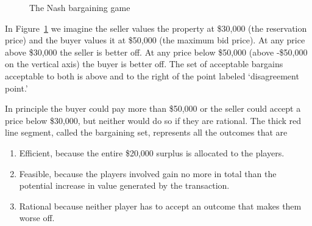 {    \begin{figure}
        \centering
        
        \caption{The Nash bargaining game}
        \label{fig:Nash-bargaining-game}
    \end{figure}


In Figure~\ref{fig:Nash-bargaining-game} we imagine the seller values the property at \$30,000 (the reservation price) and the buyer values it at \$50,000 (the maximum bid price).  At any price above \$30,000 the seller is better off. At any price below \$50,000 (above -\$50,000 on the vertical axis) the buyer is better off. 
The set of acceptable bargains acceptable to both is above and to the right of the point labeled `disagreement point.' 

In principle the buyer could pay more than \$50,000 or the seller could accept a price below \$30,000, but neither would do so if they are rational. 
The thick red line segment, called the bargaining set, represents all the outcomes that are\begin{enumerate}
    \item Efficient, because the entire \$20,000 surplus is allocated to the players. 
    \item Feasible, because the players involved gain no more in total than the potential increase in value generated by the transaction.
    \item Rational because neither player has to accept an outcome that makes them worse off.
\end{enumerate}   

}
